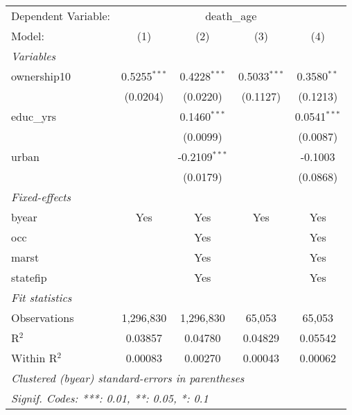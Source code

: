 
\begingroup
\centering
\begin{tabular}{lcccc}
   \tabularnewline \midrule \midrule
   Dependent Variable: & \multicolumn{4}{c}{death\_age}\\
   Model:       & (1)            & (2)             & (3)            & (4)\\  
   \midrule
   \emph{Variables}\\
   ownership10  & 0.5255$^{***}$ & 0.4228$^{***}$  & 0.5033$^{***}$ & 0.3580$^{**}$\\   
                & (0.0204)       & (0.0220)        & (0.1127)       & (0.1213)\\   
   educ\_yrs    &                & 0.1460$^{***}$  &                & 0.0541$^{***}$\\   
                &                & (0.0099)        &                & (0.0087)\\   
   urban        &                & -0.2109$^{***}$ &                & -0.1003\\   
                &                & (0.0179)        &                & (0.0868)\\   
   \midrule
   \emph{Fixed-effects}\\
   byear        & Yes            & Yes             & Yes            & Yes\\  
   occ          &                & Yes             &                & Yes\\  
   marst        &                & Yes             &                & Yes\\  
   statefip     &                & Yes             &                & Yes\\  
   \midrule
   \emph{Fit statistics}\\
   Observations & 1,296,830      & 1,296,830       & 65,053         & 65,053\\  
   R$^2$        & 0.03857        & 0.04780         & 0.04829        & 0.05542\\  
   Within R$^2$ & 0.00083        & 0.00270         & 0.00043        & 0.00062\\  
   \midrule \midrule
   \multicolumn{5}{l}{\emph{Clustered (byear) standard-errors in parentheses}}\\
   \multicolumn{5}{l}{\emph{Signif. Codes: ***: 0.01, **: 0.05, *: 0.1}}\\
\end{tabular}
\par\endgroup


